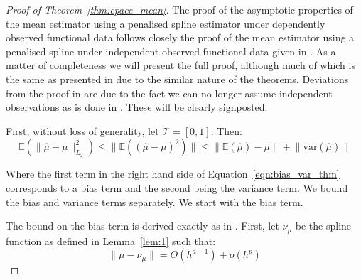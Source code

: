 \begin{proof}[Proof of Theorem~\ref{thm:cpace_mean}]
	The proof of the asymptotic properties of the mean estimator using a penalised spline estimator under dependently observed functional data follows closely the proof of the mean estimator using a penalised spline under independent observed functional data given in \citep{xiao_asymptotic_2020}.
	As a matter of completeness we will present the full proof, although much of which is the same as presented in \citep{xiao_asymptotic_2020} due to the similar nature of the theorems.
	Deviations from the proof in \citep{xiao_asymptotic_2020} are due to the fact we can no longer assume independent observations as is done in \citep{xiao_asymptotic_2020}.
	These will be clearly signposted. 
	
	First, without loss of generality, let $\mathcal{T} = \left[0, 1\right]$.
	Then:
	\begin{equation}
		\mathbb{E} \left(\lVert \hat{\mu} - \mu \rVert_{L_2}^2 \right) \leq \lVert \mathbb{E}\left( \left(\hat{\mu} - \mu \right)^2 \right) \rVert \leq \lVert \mathbb{E}\left(\hat{\mu}\right) - \mu \rVert + \lVert \text{var}\left(\hat{\mu}\right)\rVert
		\label{eqn:bias_var_thm}
	\end{equation}

Where the first term in the right hand side of Equation~\ref{eqn:bias_var_thm} corresponds to a bias term and the second being the variance term.
We bound the bias and variance terms separately.
We start with the bias term. 

The bound on the bias term is derived exactly as in \citep{xiao_asymptotic_2020}. 
First, let $\nu_\mu$ be the spline function as defined in Lemma~\ref{lem:1} such that: 
\begin{equation}
		\lVert \mu - \nu_\mu \rVert = O\left( h^{d+1} \right) + o(h^{p})
		\label{eqn:cpace_mu_nu_bound}
\end{equation}


\end{proof}

